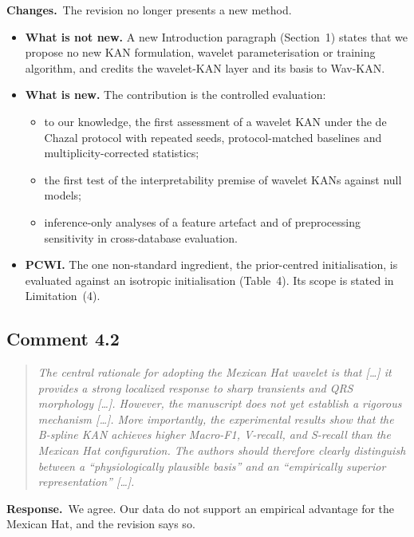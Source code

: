 \documentclass[11pt]{article}
\newenvironment{reviewer}{\begin{quote}\itshape\color{revcol}}{\end{quote}}
\newcommand{\resp}{\textbf{Response.}~}
\newcommand{\chg}{\textbf{Changes.}~}
\begin{document}
\chg The revision no longer presents a new method.
\begin{itemize}[leftmargin=1.2em,itemsep=2pt]
\item \textbf{What is not new.} A new Introduction paragraph (Section~1) states that we propose no new KAN formulation, wavelet parameterisation or training algorithm, and credits the wavelet-KAN layer and its basis to Wav-KAN.
\item \textbf{What is new.} The contribution is the controlled evaluation:
  \begin{itemize}[itemsep=0pt]
  \item to our knowledge, the first assessment of a wavelet KAN under the de Chazal protocol with repeated seeds, protocol-matched baselines and multiplicity-corrected statistics;
  \item the first test of the interpretability premise of wavelet KANs against null models;
  \item inference-only analyses of a feature artefact and of preprocessing sensitivity in cross-database evaluation.
  \end{itemize}
\item \textbf{PCWI.} The one non-standard ingredient, the prior-centred initialisation, is evaluated against an isotropic initialisation (Table~4). Its scope is stated in Limitation~(4).
\end{itemize}

\subsection*{Comment 4.2}
\begin{reviewer}
The central rationale for adopting the Mexican Hat wavelet is that [\ldots] it provides a strong localized response to sharp transients and QRS morphology [\ldots]. However, the manuscript does not yet establish a rigorous mechanism [\ldots]. More importantly, the experimental results show that the B-spline KAN achieves higher Macro-F1, V-recall, and S-recall than the Mexican Hat configuration. The authors should therefore clearly distinguish between a ``physiologically plausible basis'' and an ``empirically superior representation'' [\ldots].
\end{reviewer}
\resp We agree. Our data do not support an empirical advantage for the Mexican Hat, and the revision says so.
\end{document}
